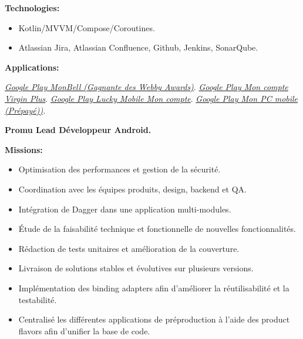 \documentclass[10pt,a4paper,withhyper]{altacv}
\begin{document}
\begin{paracol}{2}
\textbf{Technologies:}

\begin{itemize}
\addtolength{\itemindent}{0.1cm}
\item Kotlin/MVVM/Compose/Coroutines.
\item Atlassian Jira, Atlassian Confluence, Github, Jenkins, SonarQube.

\end{itemize}

\textbf{Applications:}

\href{https://play.google.com/store/apps/details?id=ca.bell.selfserve.mybellmobile&hl=fr&gl=CA&pli=1}{\textit{Google Play MonBell (Gagnante des Webby Awards)}}.
\newline
\href{https://play.google.com/store/apps/details?id=ca.virginmobile.myaccount.virginmobile&hl=fr}{\textit{Google Play Mon compte Virgin Plus}}.
\newline
\href{https://play.google.com/store/apps/details?id=ca.luckymobile&hl=fr}{\textit{Google Play Lucky Mobile Mon compte}}.
\newline
\href{https://play.google.com/store/apps/details?id=ca.pcmobile.selfserve.mypcmobile&hl=fr}{\textit{Google Play Mon PC mobile (Prépayé))}}.

\divider


\textbf{Promu Lead Développeur Android.}
\newline

\textbf{Missions:}
\begin{itemize}
\addtolength{\itemindent}{0.1cm}
\item Optimisation des performances et gestion de la sécurité.
\item Coordination avec les équipes produits, design, backend et QA.
\item Intégration de Dagger dans une application multi-modules.
\item Étude de la faisabilité technique et fonctionnelle de nouvelles fonctionnalités.
\item Rédaction de tests unitaires et amélioration de la couverture.
\item Livraison de solutions stables et évolutives sur plusieurs versions.
\item Implémentation des binding adapters afin d’améliorer la réutilisabilité et la testabilité.
\item Centralisé les différentes applications de préproduction à l’aide des product flavors afin d’unifier la base de code.
\end{itemize}


\end{paracol}
\end{document}
